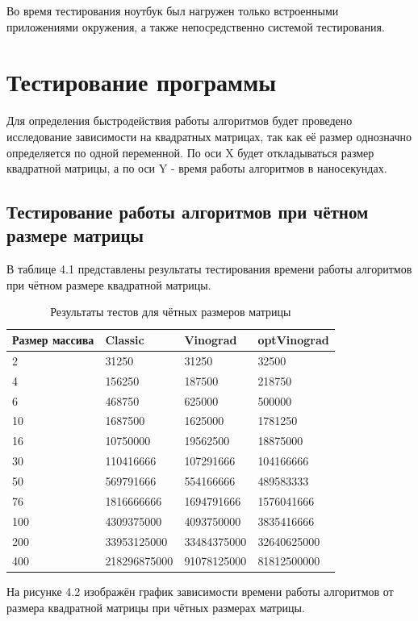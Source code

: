 Во время тестирования ноутбук был нагружен только встроенными приложениями окружения, а также непосредственно системой тестирования.

\section{Тестирование программы}
Для определения быстродействия работы алгоритмов будет проведено исследование зависимости
на квадратных матрицах, так как её размер однозначно определяется по одной переменной. 
По оси X будет откладываться размер квадратной матрицы, а по оси Y - время работы алгоритмов
в наносекундах.

\subsection{Тестирование работы алгоритмов при чётном размере матрицы}
В таблице 4.1 представлены результаты тестирования времени работы алгоритмов при чётном размере
квадратной матрицы.

\FloatBarrier
\begin{table}[h]
	\caption{Результаты тестов для чётных размеров матрицы}
	\centering
	\begin{tabular}{ | l | l | l | l |}
		\hline
		Размер массива & Classic & Vinograd & optVinograd \\ \hline
		2 & 31250 & 31250 & 32500 \\
		4 & 156250 & 187500 & 218750 \\
		6 & 468750 & 625000 & 500000 \\
		10 & 1687500 & 1625000 &  1781250 \\
		16 & 10750000 & 19562500 & 18875000 \\
		30 & 110416666 & 107291666 & 104166666 \\
		50 & 569791666 & 554166666 & 489583333 \\
		76 & 1816666666 & 1694791666 & 1576041666 \\
		100 & 4309375000 & 4093750000 & 3835416666 \\
		200 & 33953125000 & 33484375000 & 32640625000 \\
		400 & 218296875000 & 91078125000 & 81812500000 \\
		\hline
	\end{tabular}
\end{table}
\FloatBarrier

На рисунке 4.2 изображён график зависимости времени работы алгоритмов от размера 
квадратной матрицы при чётных размерах матрицы.


